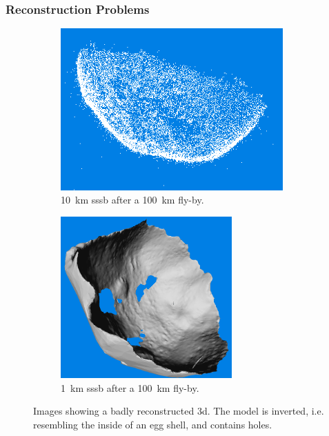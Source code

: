 \subsubsection{Reconstruction Problems} \label{sec:recon_problems}
\begin{figure}[htb]
    \centering
        \begin{subfigure}[b]{0.42\textwidth}
            \centering
            \includegraphics[width=\textwidth,height=6.2cm]{doc/thesis/0_figures/models_quality/broken/broken_points1.png}
            \caption{\SI{10}{\kilo\meter} \gls{sssb} after a \SI{100}{\kilo\meter} fly-by.} %
            \label{fig:models_broken_points}
        \end{subfigure}
        \begin{subfigure}[b]{0.42\textwidth}
            \centering
            \includegraphics[width=\textwidth,height=6.2cm]{doc/thesis/0_figures/models_quality/broken/broken_refine2.png}
            \caption{\SI{1}{\kilo\meter} \gls{sssb} after a \SI{100}{\kilo\meter} fly-by.}
            \label{fig:models_broken_mesh}
        \end{subfigure}
    \caption{Images showing a badly reconstructed \gls{3d}. The model is inverted, i.e. resembling the inside of an egg shell, and contains holes.}
    \label{fig:models_broken}
\end{figure}

